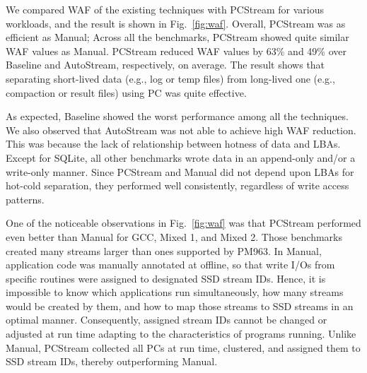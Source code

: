 We compared WAF of the existing techniques with \textsf{PCStream} for various
workloads, and the result is shown in Fig.~\ref{fig:waf}.  Overall,
\textsf{PCStream} was as efficient as \textsf{Manual}; Across all the
benchmarks, \textsf{PCStream} showed quite similar WAF values as
\textsf{Manual}. \textsf{PCStream} reduced WAF values by 63\% and 49\% over
\textsf{Baseline} and \textsf{AutoStream}, respectively, on average.  The
result shows that separating short-lived data (e.g., log or temp files) from
long-lived one (e.g., compaction or result files) using PC was quite effective.

As expected, \textsf{Baseline} showed the worst performance among all the
techniques.  We also observed that AutoStream was not able to achieve high WAF
reduction.  This was because the lack of relationship between hotness of data
and LBAs. Except for SQLite, all other benchmarks wrote data in an append-only
and/or a write-only manner. Since \textsf{PCStream} and \textsf{Manual} did not
depend upon LBAs for hot-cold separation, they performed well consistently,
regardless of write access patterns.



One of the noticeable observations in Fig.~\ref{fig:waf} was that PCStream
performed even better than Manual for GCC, Mixed 1, and Mixed 2.  Those
benchmarks created many streams larger than ones supported by PM963.  In
\textsf{Manual}, application code was manually annotated at offline, so that
write I/Os from specific routines were assigned to designated SSD stream IDs.
Hence, it is impossible to know which applications run simultaneously, how many
streams would be created by them, and how to map those streams to SSD streams
in an optimal manner. Consequently, assigned stream IDs cannot be changed or
adjusted at run time adapting to the characteristics of programs running.
Unlike \textsf{Manual}, \textsf{PCStream} collected all PCs at run time,
clustered, and assigned them to SSD stream IDs, thereby outperforming
\textsf{Manual}.


